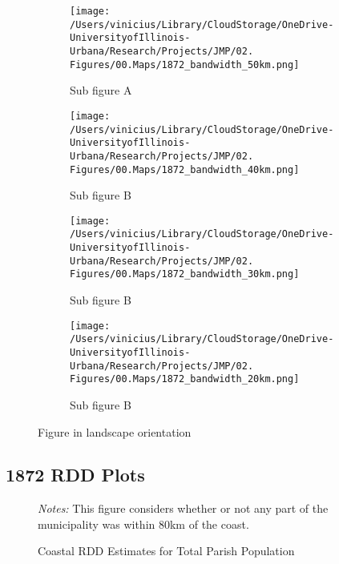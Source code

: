 \documentclass{article}
\begin{document}
\begin{figure}
  \begin{subfigure}[t]{0.45\paperwidth}\centering
      \texttt{[image: /Users/vinicius/Library/CloudStorage/OneDrive-UniversityofIllinois-Urbana/Research/Projects/JMP/02. Figures/00.Maps/1872\_bandwidth\_50km.png]}
  \caption{Sub figure A}
  \end{subfigure} 
  \begin{subfigure}[t]{0.45\paperwidth}\centering
      \texttt{[image: /Users/vinicius/Library/CloudStorage/OneDrive-UniversityofIllinois-Urbana/Research/Projects/JMP/02. Figures/00.Maps/1872\_bandwidth\_40km.png]}
  \caption{Sub figure B}
  \end{subfigure}

  \begin{subfigure}[t]{0.45\textwidth}\centering
    \texttt{[image: /Users/vinicius/Library/CloudStorage/OneDrive-UniversityofIllinois-Urbana/Research/Projects/JMP/02. Figures/00.Maps/1872\_bandwidth\_30km.png]}
  \caption{Sub figure B}
  \end{subfigure}
  \begin{subfigure}[t]{0.45\textwidth}\centering
    \texttt{[image: /Users/vinicius/Library/CloudStorage/OneDrive-UniversityofIllinois-Urbana/Research/Projects/JMP/02. Figures/00.Maps/1872\_bandwidth\_20km.png]}
  \caption{Sub figure B}
  \end{subfigure}

  \caption{Figure in landscape orientation}
  \label{fig:sub2}
\end{figure}

\clearpage

\subsection*{1872 RDD Plots}

\begin{figure}[h!]
  \caption{Coastal RDD Estimates for Total Parish Population}
  \begin{center}
  \textit{Notes:} This figure considers whether or not any part of the municipality was within 80km of the coast.
  \end{center}
  \label{fig:1872_RDD_Population}
\end{figure}
\end{document}
